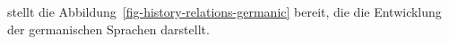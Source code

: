 \citet[]{Harbert2006a-u} stellt die Abbildung~\vref{fig-history-relations-germanic} bereit, die die Entwicklung der
germanischen Sprachen darstellt.
\begin{figure}
\begin{sideways}
\scalebox{.72}{%
}
\end{sideways}
\end{figure}
